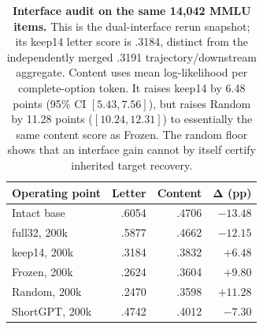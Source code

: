 \begin{table}[t]
\centering
\scriptsize
\setlength{\tabcolsep}{3.2pt}
\begin{tabular}{@{}lrrr@{}}
\toprule
\textbf{Operating point} & \textbf{Letter} & \textbf{Content} &
$\boldsymbol{\Delta}$ \textbf{(pp)} \\
\midrule
Intact base & .6054 & .4706 & $-13.48$ \\
full32, 200k & .5877 & .4662 & $-12.15$ \\
keep14, 200k & .3184 & .3832 & $+6.48$ \\
Frozen, 200k & .2624 & .3604 & $+9.80$ \\
Random, 200k & .2470 & .3598 & $+11.28$ \\
ShortGPT, 200k & .4742 & .4012 & $-7.30$ \\
\bottomrule
\end{tabular}
\caption{\textbf{Interface audit on the same 14,042 MMLU items.} This is the
dual-interface rerun snapshot; its keep14 letter score is .3184, distinct from
the independently merged .3191 trajectory/downstream aggregate.
Content uses
mean log-likelihood per complete-option token. It raises keep14 by 6.48 points
(95\% CI $[5.43,7.56]$), but raises Random by 11.28 points
($[10.24,12.31]$) to essentially the same content score as Frozen. The random
floor shows that an interface gain cannot by itself certify inherited target
recovery.}
\label{tab:interface-audit}
\end{table}
